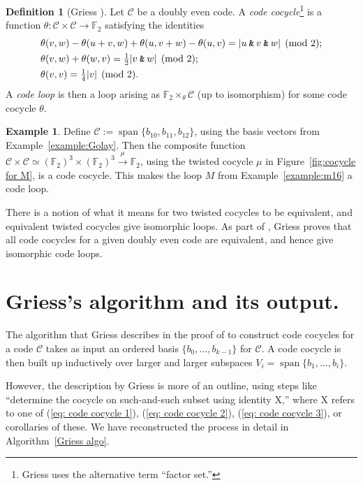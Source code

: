 \documentclass{article}
\theoremstyle{plain}
\theoremstyle{definition}
\newtheorem*{definition}{Definition}
\newtheorem{example}{Example}
\def \cC {\mathcal{C}}
\def \FF {\mathbb{F}}
\newcommand{\AND}{\mathbin{\textup{\texttt{\&}}}}
\DeclareMathOperator{\Span}{span}
\begin{document}
\begin{definition}[Griess \cite{Griess}]
\label{def:codeLoop}
Let $\cC$ be a doubly even code. 
A \emph{code cocycle}\footnote{Griess uses the alternative term ``factor set.''} is a function $\theta\colon \cC \times \cC \to \FF_2$ satisfying the identities
\begin{align}
& \theta(v,w)-\theta(u+v,w)+\theta(u,v+w)-\theta(u,v) =|u\AND v \AND w| \pmod 2; \label{eq: code cocycle 1}\\
& \theta(v,w)+\theta(w,v) = {}  \tfrac12|v\AND w| \pmod 2; \label{eq: code cocycle 2}\\
& \theta(v,v) = {}  \tfrac14|v| \pmod 2.\label{eq: code cocycle 3}
\end{align}
A \emph{code loop} is then a loop arising as $\FF_2\times_\theta \cC$ (up to isomorphism) for some code cocycle $\theta$.
\end{definition}


\begin{example}
Define $\cC := \Span\{b_{10},b_{11},b_{12}\}$, using the basis vectors from Example~\ref{example:Golay}. Then the composite function $\cC\times \cC \simeq (\FF_2)^3\times (\FF_2)^3 \xrightarrow{\mu} \FF_2$, using the twisted cocycle $\mu$ in Figure~\ref{fig:cocycle for M}, is a code cocycle. This makes the loop $M$ from Example~\ref{example:m16} a code loop.
\end{example}

There is a notion of what it means for two twisted cocycles to be equivalent, and equivalent twisted cocycles give isomorphic loops.
As part of \cite[Theorem 10]{Griess}, Griess proves that all code cocycles for a given doubly even code are equivalent, and hence give isomorphic code loops. 




\section{Griess's algorithm and its output.}

The algorithm that Griess describes in the proof of \cite[Theorem 10]{Griess} to construct code cocycles for a code $\cC$ takes as input an ordered  basis $\{b_0,\ldots,b_{k-1}\}$ for $\cC$. 
A code cocycle is then built up inductively over larger and larger subspaces $V_i = \Span\{b_1,\ldots,b_i\}$.%

However, the description by Griess is more of an outline, using steps like ``determine the cocycle on such-and-such subset using identity X,'' where X refers to one of (\ref{eq: code cocycle 1}), (\ref{eq: code cocycle 2}), (\ref{eq: code cocycle 3}), or corollaries of these. We have reconstructed the process in detail in Algorithm~\ref{Griess algo}.
\end{document}
